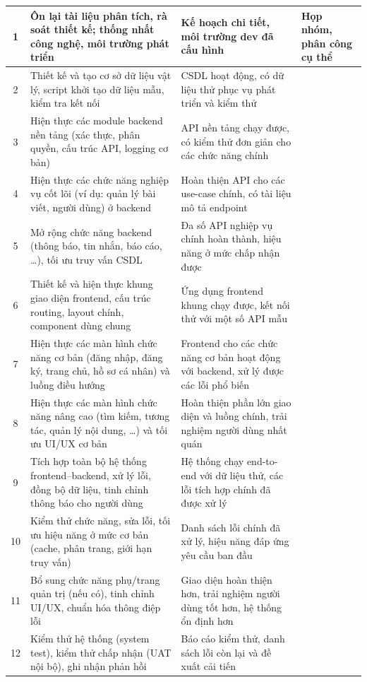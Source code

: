 \begin{center}
\begin{longtable}{|c|p{5cm}|p{4cm}|p{3cm}|}
    1 & Ôn lại tài liệu phân tích, rà soát thiết kế; thống nhất công nghệ, môi trường phát triển & Kế hoạch chi tiết, môi trường dev đã cấu hình & Họp nhóm, phân công cụ thể \\
    \hline
    2 & Thiết kế và tạo cơ sở dữ liệu vật lý, script khởi tạo dữ liệu mẫu, kiểm tra kết nối & CSDL hoạt động, có dữ liệu thử phục vụ phát triển và kiểm thử & \\
    \hline
    3 & Hiện thực các module backend nền tảng (xác thực, phân quyền, cấu trúc API, logging cơ bản) & API nền tảng chạy được, có kiểm thử đơn giản cho các chức năng chính & \\
    \hline
    4 & Hiện thực các chức năng nghiệp vụ cốt lõi (ví dụ: quản lý bài viết, người dùng) ở backend & Hoàn thiện API cho các use-case chính, có tài liệu mô tả endpoint & \\
    \hline
    5 & Mở rộng chức năng backend (thông báo, tin nhắn, báo cáo, \ldots), tối ưu truy vấn CSDL & Đa số API nghiệp vụ chính hoàn thành, hiệu năng ở mức chấp nhận được & \\
    \hline
    6 & Thiết kế và hiện thực khung giao diện frontend, cấu trúc routing, layout chính, component dùng chung & Ứng dụng frontend khung chạy được, kết nối thử với một số API mẫu & \\
    \hline
    7 & Hiện thực các màn hình chức năng cơ bản (đăng nhập, đăng ký, trang chủ, hồ sơ cá nhân) và luồng điều hướng & Frontend cho các chức năng cơ bản hoạt động với backend, xử lý được các lỗi phổ biến & \\
    \hline
    8 & Hiện thực các màn hình chức năng nâng cao (tìm kiếm, tương tác, quản lý nội dung, \ldots) và tối ưu UI/UX cơ bản & Hoàn thiện phần lớn giao diện và luồng chính, trải nghiệm người dùng nhất quán & \\
    \hline
    9 & Tích hợp toàn bộ hệ thống frontend--backend, xử lý lỗi, đồng bộ dữ liệu, tinh chỉnh thông báo cho người dùng & Hệ thống chạy end-to-end với dữ liệu thử, các lỗi tích hợp chính đã được xử lý & \\
    \hline
    10 & Kiểm thử chức năng, sửa lỗi, tối ưu hiệu năng ở mức cơ bản (cache, phân trang, giới hạn truy vấn) & Danh sách lỗi chính đã xử lý, hiệu năng đáp ứng yêu cầu ban đầu & \\
    \hline
    11 & Bổ sung chức năng phụ/trang quản trị (nếu có), tinh chỉnh UI/UX, chuẩn hóa thông điệp lỗi & Giao diện hoàn thiện hơn, trải nghiệm người dùng tốt hơn, hệ thống ổn định hơn & \\
    \hline
    12 & Kiểm thử hệ thống (system test), kiểm thử chấp nhận (UAT nội bộ), ghi nhận phản hồi & Báo cáo kiểm thử, danh sách lỗi còn lại và đề xuất cải tiến & \\

\end{longtable}
\end{center}
